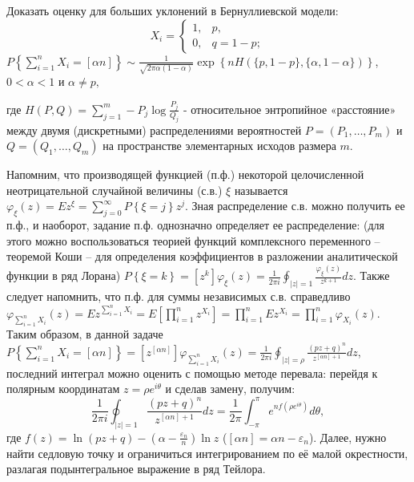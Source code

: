 \begin{problem}

Доказать оценку для больших уклонений в Бернуллиевской модели:
\[X_{i} =\left\{\begin{array}{cc} {1,} & {p,} \\ {0,} & {q=1-p;} \end{array}\right. \] 
$P\left\{\sum _{i=1}^{n}X_{i} =\left[\alpha n\right] \right\}\sim \frac{1}{\sqrt{2\pi \alpha (1-\alpha )} } \exp \left\{nH(\{ p,1-p\} ,\{ \alpha ,1-\alpha \} )\right\}$, $0<\alpha <1$ и $\alpha \ne p,$

\noindent где $H\left(P,Q\right)=\sum _{j=1}^{m}-P_{j} \log \frac{P_{j} }{Q_{j} }  $ - относительное энтропийное «расстояние» между двумя (дискретными) распределениями вероятностей $P=\left(P_{1} ,\ldots ,P_{m} \right)$ и $Q=\left(Q_{1} ,\ldots ,Q_{m} \right)$ на пространстве элементарных исходов размера $m$.

\begin{ordre}

Напомним, что производящей функцией (п.ф.) некоторой целочисленной неотрицательной случайной величины (с.в.) $\xi $ называется $\varphi _{\xi } (z)=Ez^{\xi } =\sum _{j=0}^{\infty }P\left\{\xi =j\right\} z^{j} $. Зная распределение с.в. можно получить ее п.ф., и наоборот, задание п.ф. однозначно определяет ее распределение: (для этого можно воспользоваться теорией функций комплексного переменного -- теоремой Коши -- для определения коэффициентов в разложении аналитической функции в ряд Лорана) $P\left\{\xi =k\right\}=\left[z^{k} \right]\varphi _{\xi } (z)=\frac{1}{2\pi i} \oint _{\left|z\right|=1}\frac{\varphi _{\xi } (z)}{z^{k+1} } dz $. Также следует напомнить, что п.ф. для суммы независимых с.в. справедливо $\varphi _{\sum _{i=1}^{n}X_{i}  } (z)=Ez^{\sum _{i=1}^{n}X_{i}  } =E\left[\prod _{i=1}^{n}z^{X_{i} }  \right]=\prod _{i=1}^{n}Ez^{X_{i} }  =\prod _{i=1}^{n}\varphi _{X_{i} } (z) $. Таким образом, в данной задаче $P\left\{\sum _{i=1}^{n}X_{i} =\left[\alpha n\right] \right\}=\left[z^{\left[\alpha n\right]} \right]\varphi _{\sum _{i=1}^{n}X_{i}  } (z)=\frac{1}{2\pi i} \oint _{\left|z\right|=\rho }\frac{\left(pz+q\right)^{n} }{z^{\left[\alpha n\right]+1} } dz $,\textbf{ }последний интеграл можно оценить с помощью методе перевала: перейдя к полярным координатам $z=\rho e^{i\theta } $ и сделав замену, получим:\textbf{}
\[\frac{1}{2\pi i} \oint _{\left|z\right|=1}\frac{\left(pz+q\right)^{n} }{z^{\left[\alpha n\right]+1} } dz =\frac{1}{2\pi } \int _{-\pi }^{\pi }e^{nf\left(\rho e^{i\theta } \right)} d\theta  ,\] 
где $f(z)=\ln \left(pz+q\right)-\left(\alpha -\frac{\varepsilon _{n} }{n} \right)\ln z$ ($\left[\alpha n\right]=\alpha n-\varepsilon _{n} $). Далее, нужно найти седловую точку и ограничиться интегрированием по её малой окрестности, разлагая подынтегральное выражение в ряд Тейлора.


\end{ordre}
\end{problem}
